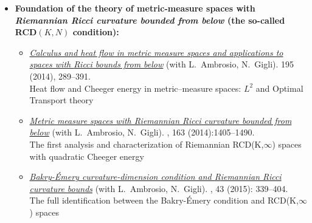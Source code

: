\documentclass[reqno,11pt]{article}
\theoremstyle{plain}
\begin{document}
\begin{itemize}[wide,
  topsep=-0.5\parsep,
  itemsep=-4pt,
  leftmargin=12pt,
  ]
\renewcommand{\labelitemi}{$\diamond$}


\item
  \textbf{Foundation of the theory of metric-measure spaces with
  \emph{Riemannian Ricci curvature bounded from below} (the so-called
  RCD$(K,N)$ condition):}

\begin{itemize}[
  topsep=-2\parsep,
  itemsep=-2pt,
  leftmargin=12pt,
  itemindent=-12pt
  ]
\renewcommand{\labelitemii}{}
  
\item%
\href{https://doi.org/10.1007/s00222-013-0456-1}{\emph{Calculus and heat flow in metric measure spaces and applications to
  spaces with {R}icci bounds from below}} (with L.~Ambrosio, N.~Gigli).
 195 (2014), 289--391. %
\\
{\small\textsf{Heat flow and Cheeger energy
in metric--measure spaces: $L^2$ and Optimal Transport theory}}


\item%
\href{https://doi.org/10.1215/00127094-2681605}{\emph{Metric measure spaces with {R}iemannian {R}icci curvature bounded
  from below}}
  (with L.~Ambrosio, N.~Gigli).
, 163
(2014):1405--1490. %
\\
{\small\textsf{The first analysis and characterization
  of Riemannian RCD(K,$\infty$) spaces with quadratic Cheeger energy}}

\item%
  \newblock
  \href{https://doi.org/10.1214/14-AOP907}{\emph{Bakry-\'{E}mery curvature-dimension condition and
{R}iemannian {R}icci curvature bounds}}
(with L.~Ambrosio, N.~Gigli).
,  43 
(2015): 339--404.  %
\\
{\small\textsf{The full identification between the Bakry-\'Emery
  condition and RCD(K,$\infty$) spaces}}


\end{itemize}
\end{itemize}
\end{document}
